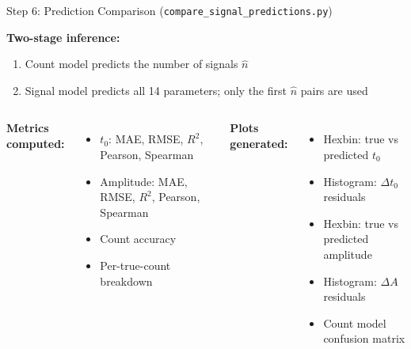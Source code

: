 \documentclass[aspectratio=169]{beamer}
\begin{document}
\begin{frame}{Step 6: Prediction Comparison (\texttt{compare\_signal\_predictions.py})}

\textbf{Two-stage inference:}
\begin{enumerate}
  \item Count model predicts the number of signals $\hat{n}$
  \item Signal model predicts all 14 parameters; only the first $\hat{n}$ pairs are used
\end{enumerate}

\medskip
\begin{columns}[T]
\textbf{Metrics computed:}
\begin{itemize}
  \item $t_0$: MAE, RMSE, $R^2$, Pearson, Spearman
  \item Amplitude: MAE, RMSE, $R^2$, Pearson, Spearman
  \item Count accuracy
  \item Per-true-count breakdown
\end{itemize}

\textbf{Plots generated:}
\begin{itemize}
  \item Hexbin: true vs predicted $t_0$
  \item Histogram: $\Delta t_0$ residuals
  \item Hexbin: true vs predicted amplitude
  \item Histogram: $\Delta A$ residuals
  \item Count model confusion matrix
\end{itemize}
\end{columns}
\end{frame}
\end{document}
